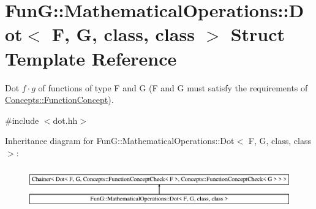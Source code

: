 \hypertarget{structFunG_1_1MathematicalOperations_1_1Dot}{}\section{FunG\+:\+:Mathematical\+Operations\+:\+:Dot$<$ F, G, class, class $>$ Struct Template Reference}
\label{structFunG_1_1MathematicalOperations_1_1Dot}


Dot $f \cdot g$ of functions of type F and G (F and G must satisfy the requirements of \hyperlink{structFunG_1_1Concepts_1_1FunctionConcept}{Concepts\+::\+Function\+Concept}).  




{\ttfamily \#include $<$dot.\+hh$>$}

Inheritance diagram for FunG\+:\+:Mathematical\+Operations\+:\+:Dot$<$ F, G, class, class $>$\+:\begin{figure}[H]
\begin{center}
\leavevmode
\includegraphics[height=1.797753cm]{structFunG_1_1MathematicalOperations_1_1Dot}
\end{center}
\end{figure}
